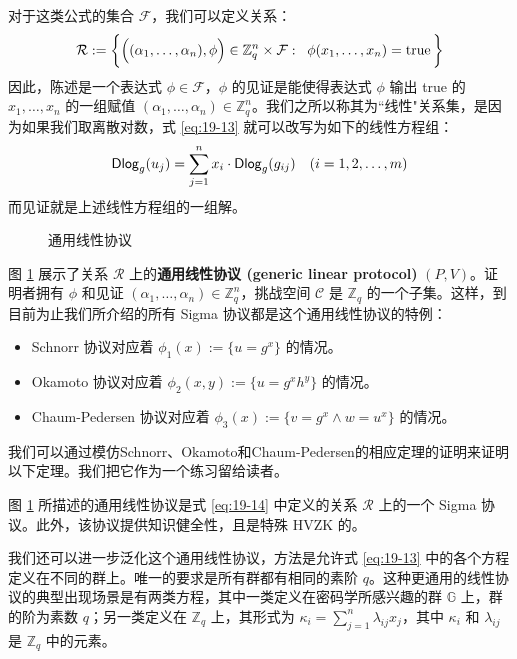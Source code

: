 对于这类公式的集合 $\mathcal{F}$，我们可以定义关系：
\begin{equation}\label{eq:19-14}
\mathcal{R}:=
\bigg\lbrace
\Big(
(\alpha_1,\dots,\alpha_n),\phi
\Big)
\in\mathbb{Z}_q^n\times\mathcal{F}:
\;\;
\phi(x_1,\dots,x_n)={\rm{true}}\,
\bigg\rbrace
\end{equation}
因此，陈述是一个表达式 $\phi\in\mathcal{F}$，$\phi$ 的见证是能使得表达式 $\phi$ 输出 true 的 $x_1,\dots,x_n$ 的一组赋值 $(\alpha_1,\dots,\alpha_n)\in\mathbb{Z}_q^n$。我们之所以称其为``线性"关系集，是因为如果我们取离散对数，式 \ref{eq:19-13} 就可以改写为如下的线性方程组：
\[
{\rm\mathsf{Dlog}}_g(u_j)=\sum_{j=1}^nx_i\cdot {\rm\mathsf{Dlog}}_g(g_{ij})
\quad
(i=1,2,\dots,m)
\]
而见证就是上述线性方程组的一组解。

\begin{figure}
  \centering
  
  \caption{通用线性协议}
  \label{fig:19-8}
\end{figure}

图 \ref{fig:19-8} 展示了关系 $\mathcal{R}$ 上的\textbf{通用线性协议 (generic linear protocol)} $(P,V)$。证明者拥有 $\phi$ 和见证 $(\alpha_1,\dots,\alpha_n)\in\mathbb{Z}_q^n$，挑战空间 $\mathcal{C}$ 是 $\mathbb{Z}_q$ 的一个子集。这样，到目前为止我们所介绍的所有 Sigma 协议都是这个通用线性协议的特例：
\begin{itemize}
	\item Schnorr 协议对应着 $\phi_1(x):=\{u=g^x\}$ 的情况。
	\item Okamoto 协议对应着 $\phi_2(x,y):=\{u=g^xh^y\}$ 的情况。
	\item Chaum-Pedersen 协议对应着 $\phi_3(x):=\{v=g^x\land w=u^x\}$ 的情况。
\end{itemize}

我们可以通过模仿Schnorr、Okamoto和Chaum-Pedersen的相应定理的证明来证明以下定理。我们把它作为一个练习留给读者。

\begin{theorem}\label{theo:19-11}
图 \ref{fig:19-8} 所描述的通用线性协议是式 \ref{eq:19-14} 中定义的关系 $\mathcal R$ 上的一个 Sigma 协议。此外，该协议提供知识健全性，且是特殊 HVZK 的。
\end{theorem}

我们还可以进一步泛化这个通用线性协议，方法是允许式 \ref{eq:19-13} 中的各个方程定义在不同的群上。唯一的要求是所有群都有相同的素阶 $q$。这种更通用的线性协议的典型出现场景是有两类方程，其中一类定义在密码学所感兴趣的群 $\mathbb{G}$ 上，群的阶为素数 $q$；另一类定义在 $\mathbb{Z}_q$ 上，其形式为 $\kappa_i=\sum_{j=1}^n\lambda_{ij}x_j$，其中 $\kappa_i$ 和 $\lambda_{ij}$ 是 $\mathbb{Z}_q$ 中的元素。

